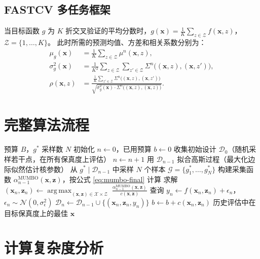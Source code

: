 \documentclass[11pt,a4paper]{article}
\newcommand{\bx}{\mathbf{x}}
\newcommand{\bz}{\mathbf{z}}
\newcommand{\cX}{\mathcal{X}}
\newcommand{\cZ}{\mathcal{Z}}
\newcommand{\cD}{\mathcal{D}}
\DeclareMathOperator*{\argmax}{arg\,max}
\begin{document}
\subsection{FASTCV 多任务框架}

当目标函数 $g$ 为 $K$ 折交叉验证的平均分数时，$g(\bx)=\frac{1}{K}\sum_{z\in\cZ}\!f(\bx,z)$，$\cZ=\{1,\ldots,K\}$。
此时所需的预测均值、方差和相关系数分别为：
\begin{align}
  \mu_g(\bx) &= \frac{1}{K}\sum_{z\in\cZ}\mu^n(\bx,z), \\
  \sigma_g^2(\bx) &= \frac{1}{K^2}\sum_{z\in\cZ}\sum_{z'\in\cZ}\Sigma^n\bigl((\bx,z),(\bx,z')\bigr), \\
  \rho(\bx,z) &= \frac{\frac{1}{K}\sum_{z'\in\cZ}\Sigma^n\bigl((\bx,z),(\bx,z')\bigr)}{\sqrt{\sigma_g^2(\bx)\cdot\Sigma^n\bigl((\bx,z),(\bx,z)\bigr)}}.
\end{align}

\section{完整算法流程}

\begin{algorithm}[H]
\caption{MUMBO：多任务最大值贝叶斯优化}
\label{alg:mumbo}
\begin{algorithmic}[1]
\Require 预算 $B$，$g^*$ 采样数 $N$
\State 初始化 $n\gets 0$，已用预算 $b\gets 0$
\State 收集初始设计 $\cD_0$（随机采样若干点，在所有保真度上评估）
  \State $n\gets n+1$
  \State 用 $\cD_{n-1}$ 拟合高斯过程（最大化边际似然估计核参数）
  \State 从 $g^*\mid\cD_{n-1}$ 中采样 $N$ 个样本 $\mathcal{G}=\{g_1^*,\ldots,g_N^*\}$ 
  \State 构建采集函数 $\alpha_{n-1}^{\mathrm{MUMBO}}(\bx,\bz)$，按公式 \eqref{eq:mumbo-final} 计算
  \State 求解 $(\bx_n,\bz_n)\gets\displaystyle\argmax_{(\bx,\bz)\in\cX\times\cZ}\;\frac{\alpha_{n-1}^{\mathrm{MUMBO}}(\bx,\bz)}{c(\bx,\bz)}$ 
  \State 查询 $y_n\gets f(\bx_n,\bz_n)+\epsilon_n$，$\epsilon_n\sim\mathcal{N}(0,\sigma_\epsilon^2)$
  \State $\cD_n\gets\cD_{n-1}\cup\{(\bx_n,\bz_n,y_n)\}$
  \State $b\gets b+c(\bx_n,\bz_n)$
\EndWhile
\State \Return 历史评估中在目标保真度上的最佳 $\bx$
\end{algorithmic}
\end{algorithm}

\section{计算复杂度分析}
\end{document}
